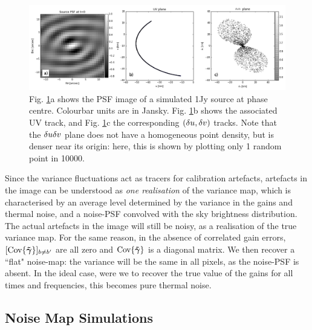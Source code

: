 \begin{figure}[h!]
\centering
\includegraphics[width=\textwidth]{images/psfIM-dudv-labelled.png}
\caption{\label{plot.psf.uv.dudv} Fig. \ref{plot.psf.uv.dudv}a shows the PSF image of a simulated 1Jy source at phase centre. {Colourbar units are in Jansky}.  Fig. \ref{plot.psf.uv.dudv}b shows the associated UV track, and Fig. \ref{plot.psf.uv.dudv}c the corresponding $\left(\delta u,\delta v\right)$ tracks. Note that the $\delta u\delta v$ plane does not have a homogeneous point density, but is denser near its origin: here, this is shown by plotting only 1 random point in 10000.}
\end{figure}


{Since the variance fluctuations act as tracers for calibration artefacts, artefacts in the image can be understood as \emph{one realisation} of the variance map, which is characterised by an average level determined by the variance in the gains and thermal noise, and a noise-PSF convolved with the sky brightness distribution}. The actual artefacts in the image will still be noisy, as a realisation of the true variance map. For the same reason, in the absence of correlated gain errors, $[\textrm{Cov}\{\bm{\tilde{\gamma}}\}]_{b \ne b'}$ are all zero and $\textrm{Cov}\{\bm{\tilde{\gamma}}\}$ is a diagonal matrix. {We then recover a ``flat" noise-map: the variance will be the same in all pixels, as the noise-PSF is absent}. In the ideal case, were we to recover the true value of the gains for all times and frequencies, this becomes pure thermal noise.
\subsection{Noise Map Simulations}\label{sec.simulations}



